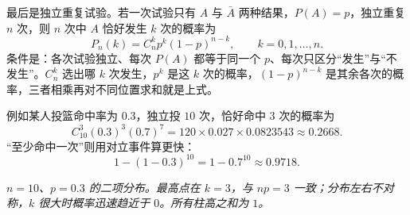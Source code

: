 最后是独立重复试验。若一次试验只有 $A$ 与 $\bar A$ 两种结果，$P(A)=p$，独立重复 $n$ 次，则 $n$ 次中 $A$ 恰好发生 $k$ 次的概率为
\[
P_n(k)=C_n^k p^k(1-p)^{n-k},\qquad k=0,1,\dots,n .
\]
条件是：各次试验独立、每次 $P(A)$ 都等于同一个 $p$、每次只区分“发生”与“不发生”。$C_n^k$ 选出哪 $k$ 次发生，$p^k$ 是这 $k$ 次的概率，$(1-p)^{n-k}$ 是其余各次的概率，三者相乘再对不同位置求和就是上式。

例如某人投篮命中率为 $0.3$，独立投 $10$ 次，恰好命中 $3$ 次的概率为
\[
C_{10}^3(0.3)^3(0.7)^7=120\times0.027\times0.0823543\approx0.2668 .
\]
“至少命中一次”则用对立事件算更快：
\[
1-(1-0.3)^{10}=1-0.7^{10}\approx0.9718 .
\]

\begin{center}
\par\vspace{2pt}
{\footnotesize\itshape $n=10$、$p=0.3$ 的二项分布。最高点在 $k=3$，与 $np=3$ 一致；分布左右不对称，$k$ 很大时概率迅速趋近于 $0$。所有柱高之和为 $1$。}
\end{center}

\newpage

